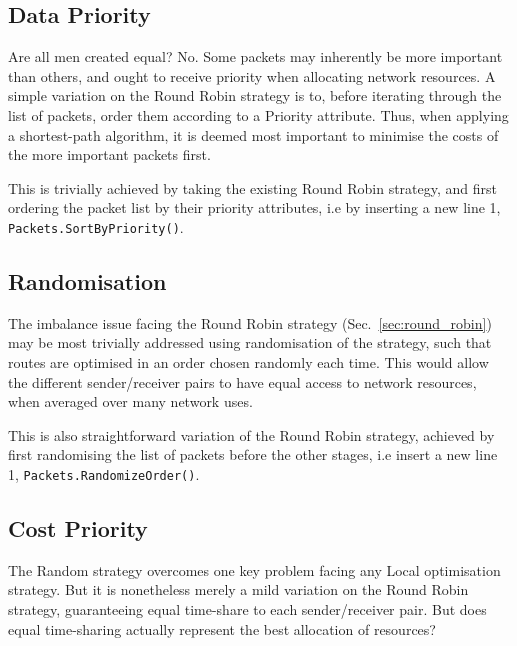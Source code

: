 \documentclass[aps,rmp,twocolumn,amsmath,amssymb,nofootinbib,superscriptaddress]{revtex4}
\begin{document}
%
%

\subsection{Data Priority} \label{sec:data_priority}

Are all men created equal? No. Some packets may inherently be more important than others, and ought to receive priority when allocating network resources. A simple variation on the {\sc Round Robin} strategy is to, before iterating through the list of packets, order them according to a {\sc Priority} attribute. Thus, when applying a shortest-path algorithm, it is deemed most important to minimise the costs of the more important packets first.

This is trivially achieved by taking the existing {\sc Round Robin} strategy, and first ordering the packet list by their priority attributes, i.e by inserting a new line 1, \mbox{\tt Packets.SortByPriority()}.

%
%

\subsection{Randomisation} \label{sec:random}

The imbalance issue facing the {\sc Round Robin} strategy (Sec.~\ref{sec:round_robin}) may be most trivially addressed using randomisation of the strategy, such that routes are optimised in an order chosen randomly each time. This would allow the different sender/receiver pairs to have equal access to network resources, when averaged over many network uses.

This is also straightforward variation of the {\sc Round Robin} strategy, achieved by first randomising the list of packets before the other stages, i.e insert a new line 1, \mbox{\tt Packets.RandomizeOrder()}.

%
%

\subsection{Cost Priority} \label{sec:cost_priority}

The {\sc Random} strategy overcomes one key problem facing any {\sc Local} optimisation strategy. But it is nonetheless merely a mild variation on the {\sc Round Robin} strategy, guaranteeing equal time-share to each sender/receiver pair. But does equal time-sharing actually represent the best allocation of resources?
\end{document}
